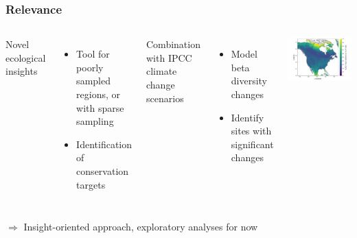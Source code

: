 \documentclass[10pt]{beamer}
\begin{document}
\begin{frame}
  \frametitle{Relevance}
  \begin{columns}
    \hspace*{-0cm}
      Novel ecological insights
      \begin{itemize}
        \item Tool for poorly sampled regions, or with sparse sampling
        \item Identification of conservation targets
      \end{itemize}
      \vspace{0.5cm}
      Combination with IPCC climate change scenarios
      \begin{itemize}
        \item Model beta diversity changes
        \item Identify sites with significant changes
      \end{itemize}
      \vspace{0.5cm}
    \hspace*{-1cm}
      \includegraphics[scale=0.10]{fig/05_sdm_lcbd.png}
  \end{columns}
  $\Rightarrow$ Insight-oriented approach, exploratory analyses for now
\end{frame}
\end{document}

